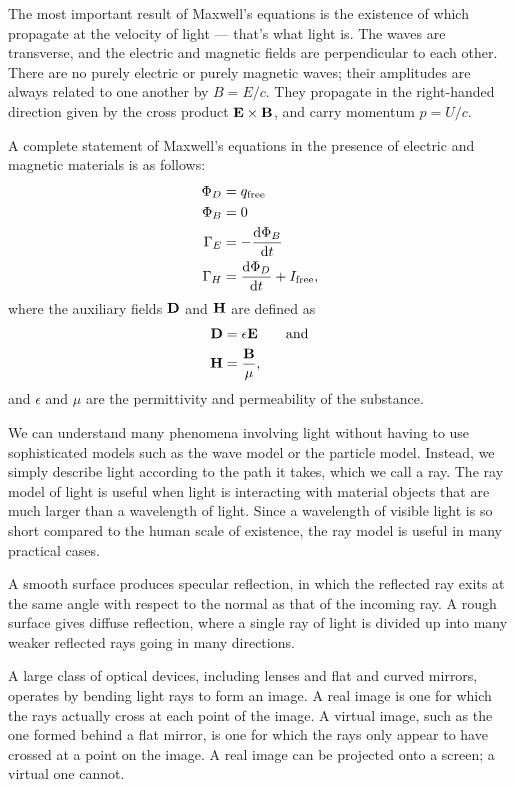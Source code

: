 	The most important result of Maxwell's equations is the existence of
	 which propagate at the velocity of light --- that's
	what light is. The waves are transverse, and the electric and magnetic fields
	are perpendicular to each other. There are no purely electric or purely magnetic
	waves; their amplitudes are always related to one another by $B=E/c$. They propagate
	in the right-handed direction given by the cross product $\mathbf{E}\times\mathbf{B}$, and
	carry momentum $p=U/c$.

A complete statement of Maxwell's equations in the presence of electric and magnetic materials is as follows:
\begin{align*}
    \Phi_D &= q_\text{free} \\
    \Phi_B &= 0 \\
    \Gamma_E &= -\frac{\operatorname{d\!} \Phi_B}{\operatorname{d\!} t} \\
    \Gamma_H &= \frac{\operatorname{d\!} \Phi_D}{\operatorname{d\!} t} + I_\text{free},
\end{align*}
where the auxiliary fields $\mathbf{D}$ and $\mathbf{H}$ are defined as
\begin{align*}
  \mathbf{D} &=\epsilon \mathbf{E} \qquad  \text{and}\\
  \mathbf{H} &= \frac{\mathbf{B}}{\mu},
\end{align*}
and $\epsilon$ and $\mu$ are the permittivity and permeability of the substance.
	
We can understand many phenomena involving light without
having to use sophisticated models such as the wave model or
the particle model. Instead, we simply describe light
according to the path it takes, which we call a ray. The ray
model of light is useful when light is interacting with
material objects that are much larger than a wavelength of
light. Since a wavelength of visible light is so short
compared to the human scale of existence, the ray model is
useful in many practical cases.

A smooth surface produces specular reflection, in which the
reflected ray exits at the same angle with respect to the
normal as that of the incoming ray. A rough surface gives
diffuse reflection, where a single ray of light is divided
up into many weaker reflected rays going in many directions.

A large class of optical devices, including lenses and flat
and curved mirrors, operates by bending light rays to form
an image. A real image is one for which the rays actually
cross at each point of the image. A virtual image, such as
the one formed behind a flat mirror, is one for which the
rays only appear to have crossed at a point on the image. A
real image can be projected onto a screen; a virtual one cannot.

